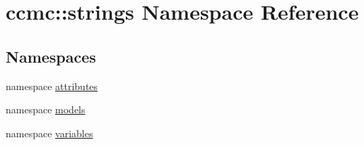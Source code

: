 \hypertarget{namespaceccmc_1_1strings}{\section{ccmc\-:\-:strings Namespace Reference}
\label{namespaceccmc_1_1strings}
}
\subsection*{Namespaces}
\begin{DoxyCompactItemize}
\item 
namespace \hyperlink{namespaceccmc_1_1strings_1_1attributes}{attributes}
\item 
namespace \hyperlink{namespaceccmc_1_1strings_1_1models}{models}
\item 
namespace \hyperlink{namespaceccmc_1_1strings_1_1variables}{variables}
\end{DoxyCompactItemize}
